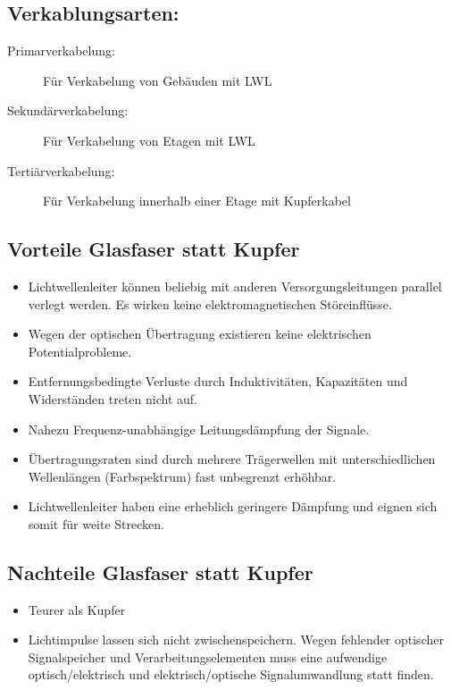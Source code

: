 \documentclass[12pt,a4paper]{article}
\begin{document}
		\subsection{Verkablungsarten:}
		\begin{description}
			\item[Primarverkabelung: ] Für Verkabelung von Gebäuden mit LWL
			\item[Sekundärverkabelung: ] Für Verkabelung von Etagen mit LWL
			\item[Tertiärverkabelung: ] Für Verkabelung innerhalb einer Etage mit Kupferkabel
		\end{description}

		\subsection{Vorteile Glasfaser statt Kupfer}
		\begin{itemize}
			\item Lichtwellenleiter können beliebig mit anderen Versorgungsleitungen parallel verlegt werden. Es wirken keine elektromagnetischen Störeinflüsse.
			\item Wegen der optischen Übertragung existieren keine elektrischen Potentialprobleme.
			\item Entfernungsbedingte Verluste durch Induktivitäten, Kapazitäten und Widerständen treten nicht auf.
			\item Nahezu Frequenz-unabhängige Leitungsdämpfung der Signale.
			\item Übertragungsraten sind durch mehrere Trägerwellen mit unterschiedlichen Wellenlängen (Farbspektrum) fast unbegrenzt erhöhbar.
			\item Lichtwellenleiter haben eine erheblich geringere Dämpfung und eignen sich somit für weite Strecken.
		\end{itemize}

		\subsection{Nachteile Glasfaser statt Kupfer}
		\begin{itemize}
			\item Teurer als Kupfer
			\item Lichtimpulse lassen sich nicht zwischenspeichern. Wegen fehlender optischer Signalspeicher und Verarbeitungselementen muss eine aufwendige optisch/elektrisch und elektrisch/optische Signalumwandlung statt finden.
		\end{itemize}
	
\end{document}
